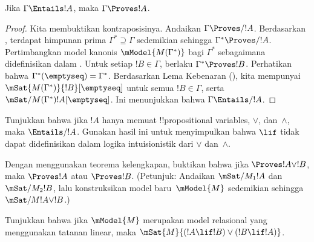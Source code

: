 \documentclass[../../../include/open-logic-section]{subfiles}
\begin{document}


\begin{thm}
  Jika $\Gamma \Entails !A$, maka $\Gamma \Proves !A$.
\end{thm}

\begin{proof}
  Kita membuktikan kontraposisinya. Andaikan $\Gamma \Proves/ !A$.
  Berdasarkan , terdapat himpunan prima
  $\Gamma^*\supseteq\Gamma$ sedemikian sehingga
  $\Gamma^*\Proves/ !A$. Pertimbangkan model kanonis
  $\mModel{M(\Gamma^*)}$ bagi $\Gamma^*$ sebagaimana didefinisikan dalam
  . Untuk setiap $!B\in\Gamma$, berlaku
  $\Gamma^*\Proves !B$. Perhatikan bahwa
  $\Gamma^*(\emptyseq)=\Gamma^*$. Berdasarkan Lema Kebenaran
  (), kita mempunyai
  $\mSat{M(\Gamma^*)}{!B}[\emptyseq]$ untuk semua $!B\in\Gamma$, serta
  $\mSat/{M(\Gamma^*)}{!A}[\emptyseq]$. Ini menunjukkan bahwa
  $\Gamma\Entails/ !A$.
\end{proof}

\begin{prob}
  Tunjukkan bahwa jika $!A$ hanya memuat !!{propositional variable}s,
  $\lor$, dan~$\land$, maka $\Entails/ !A$. Gunakan hasil ini untuk
  menyimpulkan bahwa $\lif$ tidak dapat didefinisikan dalam logika
  intuisionistik dari $\lor$ dan~$\land$.
\end{prob}

\begin{prob}
  Dengan menggunakan teorema kelengkapan, buktikan bahwa jika
  $\Proves !A\lor !B$, maka $\Proves !A$ atau $\Proves !B$.
  (Petunjuk: Andaikan $\mSat/{M_1}{!A}$ dan $\mSat/{M_2}{!B}$, lalu
  konstruksikan model baru~$\mModel{M}$ sedemikian sehingga
  $\mSat/{M}{!A\lor !B}$.)
\end{prob}

\begin{prob}
  Tunjukkan bahwa jika $\mModel{M}$ merupakan model relasional yang
  menggunakan tatanan linear, maka
  $\mSat{M}{(!A\lif !B)\lor(!B\lif !A)}$.
\end{prob}
\end{document}

